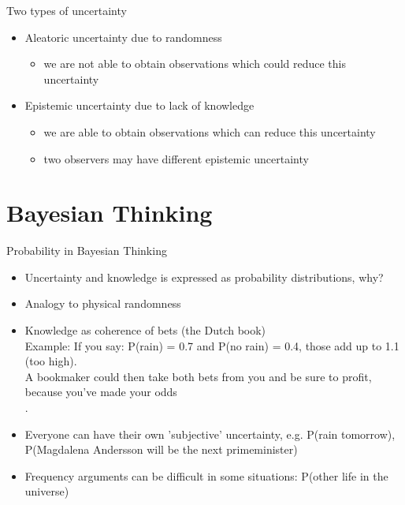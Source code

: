 \documentclass[10pt]{beamer}
\begin{document}
\begin{frame}{Two types of uncertainty}

  \begin{itemize}
  \item Aleatoric uncertainty due to randomness
    \begin{itemize}
    \item<1-> we are not able to obtain observations which could reduce
      this uncertainty
    \end{itemize}
    \vspace{\baselineskip}
  \item Epistemic uncertainty due to lack of knowledge
    \begin{itemize}
    \item<2-> we are able to obtain observations which can reduce
      this uncertainty
    \item<3-> two observers may have different epistemic uncertainty
    \end{itemize}
  \end{itemize}
\end{frame}


\section{Bayesian Thinking}
\frame{\sectionpage}

\begin{frame}{Probability in Bayesian Thinking}

  \begin{itemize}
  \item Uncertainty and knowledge is expressed as probability distributions, why? \pause
    \item Analogy to physical randomness
    \item Knowledge as coherence of bets (the Dutch book)
     \\ Example: If you say: P(rain) = 0.7 and P(no rain) = 0.4, those add up to 1.1 (too high).\\
A bookmaker could then take both bets from you and be sure to profit, because you’ve made your odds \\ .
  \pause
  \item Everyone can have their own 'subjective' uncertainty, e.g.  P(rain tomorrow), P(Magdalena Andersson will be the next primeminister)
  \item Frequency arguments can be difficult in some situations: P(other life in the universe)
  \end{itemize}
\end{frame}
\end{document}
